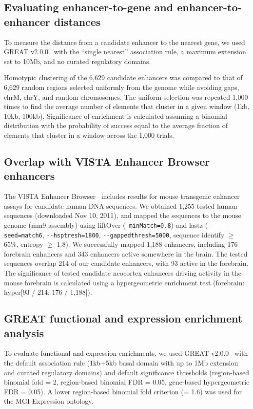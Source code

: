 \subsection{Evaluating enhancer-to-gene and enhancer-to-enhancer distances}
To measure the distance from a candidate enhancer to the nearest gene, we used GREAT v2.0.0~\citep{McLean2010} with the ``single nearest'' association
rule, a maximum extension set to 10Mb, and no curated regulatory domains.

Homotypic clustering of the 6,629 candidate enhancers was compared to that of 6,629 random regions selected uniformly from the genome while avoiding
gaps, chrM, chrY, and random chromosomes.  The uniform selection was repeated 1,000 times to find the average number of elements that cluster in a
given window (1kb, 10kb, 100kb).  Significance of enrichment is calculated assuming a binomial distribution with the probability of success equal to
the average fraction of elements that cluster in a window across the 1,000 trials.

\subsection{Overlap with VISTA Enhancer Browser enhancers}
The VISTA Enhancer Browser~\citep{Pennacchio2006} includes results for mouse transgenic enhancer assays for candidate human DNA sequences.
We obtained 1,255 tested human sequences (downloaded Nov 10, 2011), and mapped the sequences to the mouse genome (mm9 assembly) using
liftOver (\texttt{-minMatch=0.8}) and lastz (\texttt{-{}-seed=match6}, \texttt{-{}-hsptresh=1800}, \texttt{-{}-gappedthresh=5000}, sequence identify $\ge$ 65\%, entropy $\ge$ 1.8).  We
successfully mapped 1,188 enhancers, including 176 forebrain enhancers and 343 enhancers active somewhere in the brain.  The tested sequences
overlap 214 of our candidate enhancers, with 93 active in the forebrain.  The significance of tested candidate neocortex enhancers driving
activity in the mouse forebrain is calculated using a hypergeometric enrichment test (forebrain: hyper[93 / 214; 176 / 1,188]).

\subsection{GREAT functional and expression enrichment analysis}
To evaluate functional and expression enrichments, we used GREAT v2.0.0~\citep{McLean2010} with the default association rule
(1kb+5kb basal domain with up to 1Mb extension and curated regulatory domains) and default significance thresholds (region-based binomial
fold = 2, region-based binomial FDR = 0.05, gene-based hypergeometric FDR = 0.05).  A lower region-based binomial fold criterion (= 1.6) was
used for the MGI Expression ontology.

